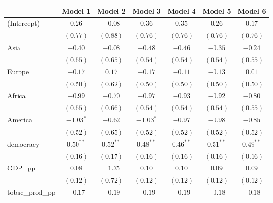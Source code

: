 
\begin{table}[!h]
\begin{center}
\begin{tabular}{l c c c c c c }
\toprule
 & Model 1 & Model 2 & Model 3 & Model 4 & Model 5 & Model 6 \\
\midrule
(Intercept)             & $0.26$       & $-0.08$      & $0.36$       & $0.35$       & $0.26$       & $0.17$       \\
                        & $(0.77)$     & $(0.88)$     & $(0.76)$     & $(0.76)$     & $(0.76)$     & $(0.76)$     \\
Asia                    & $-0.40$      & $-0.08$      & $-0.48$      & $-0.46$      & $-0.35$      & $-0.24$      \\
                        & $(0.55)$     & $(0.65)$     & $(0.54)$     & $(0.54)$     & $(0.54)$     & $(0.55)$     \\
Europe                  & $-0.17$      & $0.17$       & $-0.17$      & $-0.11$      & $-0.13$      & $0.01$       \\
                        & $(0.50)$     & $(0.62)$     & $(0.50)$     & $(0.50)$     & $(0.50)$     & $(0.50)$     \\
Africa                  & $-0.99$      & $-0.70$      & $-0.97$      & $-0.93$      & $-0.92$      & $-0.80$      \\
                        & $(0.55)$     & $(0.66)$     & $(0.54)$     & $(0.54)$     & $(0.54)$     & $(0.55)$     \\
America                 & $-1.03^{*}$  & $-0.62$      & $-1.03^{*}$  & $-0.97$      & $-0.98$      & $-0.85$      \\
                        & $(0.52)$     & $(0.65)$     & $(0.52)$     & $(0.52)$     & $(0.52)$     & $(0.52)$     \\
democracy               & $0.50^{**}$  & $0.52^{**}$  & $0.48^{**}$  & $0.46^{**}$  & $0.51^{**}$  & $0.49^{**}$  \\
                        & $(0.16)$     & $(0.17)$     & $(0.16)$     & $(0.16)$     & $(0.16)$     & $(0.16)$     \\
GDP\_pp                 & $0.08$       & $-1.35$      & $0.10$       & $0.10$       & $0.09$       & $0.09$       \\
                        & $(0.12)$     & $(0.72)$     & $(0.12)$     & $(0.12)$     & $(0.12)$     & $(0.12)$     \\
tobac\_prod\_pp         & $-0.17$      & $-0.19$      & $-0.19$      & $-0.19$      & $-0.18$      & $-0.18$      \\

\end{tabular}
\end{center}
\end{table}
